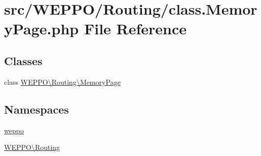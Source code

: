 \hypertarget{class_8MemoryPage_8php}{}\section{src/\+W\+E\+P\+P\+O/\+Routing/class.Memory\+Page.\+php File Reference}
\label{class_8MemoryPage_8php}
\subsection*{Classes}
\begin{DoxyCompactItemize}
\item 
class \hyperlink{classWEPPO_1_1Routing_1_1MemoryPage}{W\+E\+P\+P\+O\textbackslash{}\+Routing\textbackslash{}\+Memory\+Page}
\end{DoxyCompactItemize}
\subsection*{Namespaces}
\begin{DoxyCompactItemize}
\item 
 \hyperlink{namespaceweppo}{weppo}
\item 
 \hyperlink{namespaceWEPPO_1_1Routing}{W\+E\+P\+P\+O\textbackslash{}\+Routing}
\end{DoxyCompactItemize}
